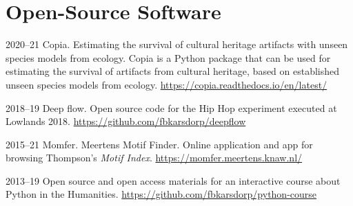 \documentclass[12pt,letterpaper]{report}
\begin{document}
\section*{Open-Source Software}
\begin{tablist}
  \item[2020--21] \tab{}Copia. Estimating the survival of cultural heritage artifacts with
    unseen species models from ecology. Copia is a Python package that can be used for
    estimating the survival of artifacts from cultural heritage, based on established
    unseen species models from ecology. \url{https://copia.readthedocs.io/en/latest/}
  \item[2018--19] \tab{}Deep flow. Open source code for the Hip Hop experiment executed at
    Lowlands 2018. \url{https://github.com/fbkarsdorp/deepflow}
  \item[2015--21] \tab{}Momfer. Meertens Motif Finder. Online application and app for
    browsing Thompson's \textit{Motif Index}. \url{https://momfer.meertens.knaw.nl/}
  \item[2013--19] \tab{}Open source and open access materials for an interactive course
    about Python in the Humanities. \url{https://github.com/fbkarsdorp/python-course}
\end{tablist}
\end{document}
